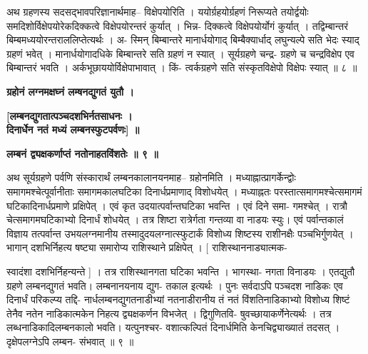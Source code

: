 \documentclass[11pt, openany]{book}
\begin{document}
{{{{\vspace{2mm}
\justifying
 अथ ग्रहणस्य सदसद्भावपरिज्ञानार्थमाह-- विक्षेपयोरिति ।
ययोर्ग्रहयोर्ग्रहणं
निरूप्यते तयोर्द्वयोः समदिशोर्विक्षेपयोरेकदिक्कत्वे विक्षेपयोरन्तरं
कुर्यात् । भिन्न-
दिक्कत्वे विक्षेपयोर्योगं कुर्यात् । तद्विम्बान्तरं
बिम्बमध्ययोरन्तराललिप्तेत्यर्थः । अ-
स्मिन् बिम्बान्तरे मानार्धयोगाद् बिम्बैक्यार्धाद् लघुन्यल्पे सति भेदः
स्याद् ग्रहणं
भवेत् । मानार्धयोगादधिके बिम्बान्तरे सति ग्रहणं न स्यात् ।
सूर्यग्रहणे चन्द्र-
ग्रहणे च चन्द्रविक्षेप एव बिम्बान्तरं भवति ।
अर्कभूछाययोर्विक्षेपाभावात् । किं-
त्वर्कग्रहणे सति संस्कृतविक्षेपो विक्षेपः स्यात् ॥ ८ ॥

\vspace{2mm}
\centering
\textbf{
 ग्रहोनं लग्नमक्षघ्नं लम्षनद्युगतं युतौ ।}
 
 \textbf{
 [लम्बनद्युगतात्पञ्चदशभिर्नतसाधनः ।\\
 \hspace{0.3cm}
 दिनार्धेन नतं मध्यं लम्बनस्फुटपर्वणः] ॥}
 
 \textbf{
\hspace{1cm}
 लम्बनं द्व्यक्षकर्णाप्तं नतोनाहतविंशतेः ॥ ९ ॥  }

\vspace{2mm}
\justifying
 अथ सूर्यग्रहणे पर्वणि संस्कारार्थं लम्बनकालानयनमाह-- ग्रहोनमिति ।
मध्याह्नात्प्रागर्केन्द्वोः समागमश्चेत्पूर्वानीताः समागमकालघटिका
दिनार्धप्रमाणाद्
विशोधयेत् । मध्याह्नतः परस्तात्समागमश्चेत्समागमं घटिकादिनार्धप्रमाणे
प्रक्षिपेत् । एवं कृत उदयात्पर्वान्तघटिका भवन्ति । एवं
दिने समा-
गमश्चेत् । रात्रौ चेत्समागमघटिकाभ्यो दिनार्धं शोधयेत् । तत्र शिष्टा
रात्रेर्गता
गन्तव्या वा नाडयः स्युः। एवं पर्वान्तकालं विज्ञाय तत्पर्वान्त
उभयलग्नमानीय
तस्मादुदयलग्नात्स्फुटार्कं विशोध्य शिष्टस्य राशीनक्षैः पञ्चभिर्गुणयेत्
। भागान्
दशभिर्निहत्य षष्ट्या समारोप्य राशिस्थाने प्रक्षिपेत् । [
राशिस्थाननाड्यात्मक-

\newpage
\thispagestyle{fancy}
\fancyhf{}
\rhead{[ग्रहणाधिकारः]}
\justifying
\noindent
स्वादंशा दशभिर्निहन्यन्ते ] । तत्र राशिस्थानगता घटिका भवन्ति ।
भागस्था-
नगता विनाडयः । एतद्युतौ ग्रहणे लम्बनद्युगतं भवति। लम्बनानयनाय
द्युग-
तकाल इत्यर्थः । पुनः सर्वदाऽपि पञ्चदश नाडिकः एव दिनार्धं परिकल्प्य
तद्दि-
नार्धलम्बनद्युगतनाडीभ्यां नतनाडीरानीय तं नतं विंशतिनाडिकाभ्यो विशोध्य
शिष्टं तेनैव नतेन नाडिकात्मकेन निहत्य द्व्यक्षकर्णन विभजेत् ।
द्विगुणितवि-
षुवच्छायाकर्णेनेत्यर्थः । तत्र लब्धनाडिकादिलम्बनकालो भवति।
यत्पुनश्चर-
वशात्कल्पितं दिनार्धमिति केनचिद्व्याख्यातं तदसत् । दृक्षेपलग्नेऽपि
लम्बन-
संभवात् ॥ ९ ॥

}}}}
\end{document}
